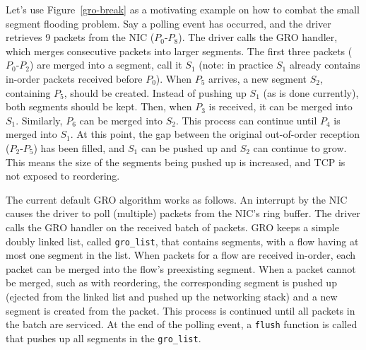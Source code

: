  Let's use Figure~\ref{gro-break} as a motivating example 
on how to combat the small segment flooding problem. Say a polling event has occurred, and the driver retrieves
9 packets from the NIC ($P_0$-$P_8$). The driver calls the GRO handler, which merges consecutive packets
into larger segments. The first three packets ($P_0$-$P_2$) are merged into a segment, call it $S_1$ (note: in practice
$S_1$ already contains in-order packets received before $P_0$).
When $P_5$ arrives, a new segment $S_2$, containing $P_5$, should be created. Instead of pushing up $S_1$ (as is done currently),
both segments should be kept.
Then, when $P_3$ is received, it can be merged into $S_1$. Similarly, $P_6$ can be merged into $S_2$. This process
can continue until $P_4$ is merged into $S_1$. At this point, the gap between the original out-of-order reception ($P_2$-$P_5$)
 has been filled, and $S_1$ can be pushed up and $S_2$ can continue to grow. This means the size of the segments being pushed up is increased,
and TCP is not exposed to reordering.

The current default GRO algorithm works as follows. An interrupt by the NIC causes the driver to poll
(multiple) packets from the NIC's ring buffer. The driver calls the GRO handler on the received batch
of packets. GRO keeps a simple doubly linked list, called {\tt gro\_list}, that contains 
segments, with a flow having at most one segment in the list. When packets for a flow are
received in-order, each packet can be merged into the flow's preexisting segment. When a packet
cannot be merged, such as with reordering, the corresponding segment is pushed up (ejected from the
linked list and pushed up the networking stack) and a new segment is created from the packet. 
This process is continued until all packets in the batch are serviced. At the end 
of the polling event, a {\tt flush} function is called that pushes up all segments in the
{\tt gro\_list}.

